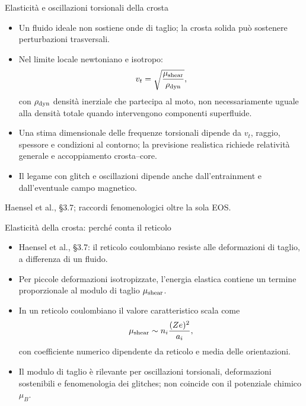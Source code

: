 \begin{frame}[t]{Elasticità e oscillazioni torsionali della crosta}
\small
\begin{itemize}
\item Un fluido ideale non sostiene onde di taglio; la crosta solida può sostenere perturbazioni trasversali.
\item Nel limite locale newtoniano e isotropo:
\[
v_t=\sqrt{\frac{\mu_{\rm shear}}{\rho_{\rm dyn}}},
\]
con $\rho_{\rm dyn}$ densità inerziale che partecipa al moto, non necessariamente uguale alla densità totale quando intervengono componenti superfluide.
\item Una stima dimensionale delle frequenze torsionali dipende da $v_t$, raggio, spessore e condizioni al contorno; la previsione realistica richiede relatività generale e accoppiamento crosta--core.
\item Il legame con glitch e oscillazioni dipende anche dall'entrainment e dall'eventuale campo magnetico.
\end{itemize}
{\footnotesize Haensel et al., §3.7; raccordi fenomenologici oltre la sola EOS.}
\end{frame}

\begin{frame}[t]{Elasticità della crosta: perché conta il reticolo}
\small
\begin{itemize}
\item Haensel et al., \S3.7: il reticolo coulombiano resiste alle deformazioni di taglio, a differenza di un fluido.
\item Per piccole deformazioni isotropizzate, l'energia elastica contiene un termine proporzionale al modulo di taglio \(\mu_{\rm shear}\).
\item In un reticolo coulombiano il valore caratteristico scala come
\[
\mu_{\rm shear}\sim n_i\frac{(Ze)^2}{a_i},
\]
con coefficiente numerico dipendente da reticolo e media delle orientazioni.
\item Il modulo di taglio è rilevante per oscillazioni torsionali, deformazioni sostenibili e fenomenologia dei glitches; non coincide con il potenziale chimico \(\mu_B\).
\end{itemize}
\end{frame}

